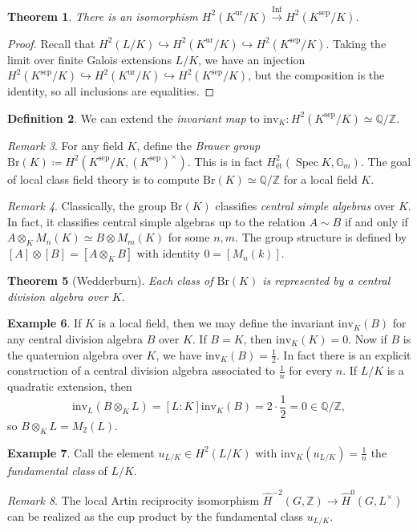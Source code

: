 \documentclass[leqno, openany]{memoir}
\newtheorem{thm}{Theorem}[section]
\theoremstyle{definition}
\newtheorem{defn}[thm]{Definition}
\newtheorem{exm}[thm]{Example}
\theoremstyle{remark}
\newtheorem{rmk}[thm]{Remark}
\theoremstyle{plain}
\theoremstyle{definition}
\theoremstyle{remark}
\newcommand{\Z}{\mathbb{Z}}
\newcommand{\Q}{\mathbb{Q}}
\newcommand{\mr}[1]{\mathrm{#1}}
\newcommand{\wh}[1]{\widehat{#1}}
\DeclareMathOperator{\Spec}{Spec}
\DeclareMathOperator{\Inf}{Inf}
\begin{document}
\begin{thm}
    There is an isomorphism $H^2(K^{\mr{ur}}/K) \xrightarrow{\Inf} H^2(K^{\mr{sep}}/K)$.
\end{thm}

\begin{proof}
    Recall that $H^2(L/K) \hookrightarrow H^2(K^{\mr{ur}}/K) \hookrightarrow H^2(K^{\mr{sep}}/K)$. Taking the limit over finite Galois extensions $L/K$, we have an injection $H^2(K^{\mr{sep}}/K) \hookrightarrow H^2(K^{\mr{ur}}/K) \hookrightarrow H^2(K^{\mr{sep}}/K)$, but the composition is the identity, so all inclusions are equalities.
\end{proof}

\begin{defn}
    We can extend the \textit{invariant map} to $\mr{inv}_K \colon H^2(K^{\mr{sep}}/K) \simeq \Q/\Z$. 
\end{defn}

\begin{rmk}
    For any field $K$, define the \textit{Brauer group} $\mr{Br}(K) \coloneqq H^2(K^{\mr{sep}}/K, {(K^{\mr{sep}})}^{\times})$. This is in fact $H^2_{\text{\'et}}(\Spec K, \mathbb{G}_m)$. The goal of local class field theory is to compute $\mr{Br}(K) \simeq \Q/\Z$ for a local field $K$.
\end{rmk}

\begin{rmk}
    Classically, the group $\mr{Br}(K)$ classifies \textit{central simple algebras} over $K$. In fact, it classifies central simple algebras up to the relation $A \sim B$ if and only if $A \otimes_K M_n(K) \simeq B \otimes M_m(K)$ for some $n, m$. The group structure is defined by $[A] \otimes [B] = [A \otimes_K B]$ with identity $0 = [M_n(k)]$.
\end{rmk}

\begin{thm}[Wedderburn]
    Each class of $\mr{Br}(K)$ is represented by a central division algebra over $K$.
\end{thm}

\begin{exm}
    If $K$ is a local field, then we may define the invariant $\mr{inv}_K(B)$ for any central division algebra $B$ over $K$. If $B = K$, then $\mr{inv}_K(K) = 0$. Now if $B$ is the quaternion algebra over $K$, we have $\mr{inv}_K(B) = \frac{1}{2}$. In fact there is an explicit construction of a central division algebra associated to $\frac{1}{n}$ for every $n$. If $L/K$ is a quadratic extension, then
    \[ \mr{inv}_L(B \otimes_K L) = [L:K] \mr{inv}_K(B) = 2 \cdot \frac{1}{2} = 0 \in \Q/\Z, \]
    so $B \otimes_K L = M_2(L)$.
\end{exm}

\begin{exm}
    Call the element $u_{L/K} \in H^2(L/K)$ with $\mr{inv}_K(u_{L/K}) = \frac{1}{n}$ the \textit{fundamental class} of $L/K$. 
\end{exm}

\begin{rmk}
    The local Artin reciprocity isomorphism $\wh{H}^{-2}(G, \Z) \to \wh{H}^0(G, L^{\times})$ can be realized as the cup product by the fundamental class $u_{L/K}$.
\end{rmk}
\end{document}
